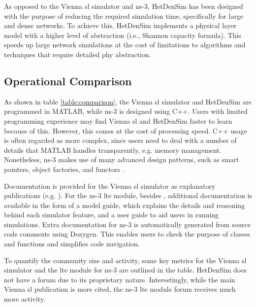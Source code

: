 \documentclass[conference]{IEEEtran}
\begin{document}
As opposed to the Vienna \ac{sl} simulator and ns-3, HetDenSim has been designed with the purpose of reducing the required simulation time, specifically for large and dense networks. To achieve this, HetDenSim implements a physical layer model with a higher level of abstraction (i.e., Shannon capacity formula). This speeds up large network simulations at the cost of limitations to algorithms and techniques that require detailed \ac{phy} abstraction.

\subsection{Operational Comparison}\label{subsect:operational}

As shown in table \ref{table:comparison}, the Vienna \ac{sl} simulator and HetDenSim are programmed in
MATLAB, while ns-3 is designed using C++.
 Users with limited programming experience may find Vienna \ac{sl} and HetDenSim faster to learn because of this. However, this comes at the cost of processing speed. C++ usage is often regarded as more complex, since users need to deal with a number of details that MATLAB handles transparently, e.g. memory management. Nonetheless, ns-3 makes use of many advanced design patterns, such as smart pointers, object factories, and functors \cite{Alexandrescu2001}.

Documentation is provided for the Vienna \ac{sl} simulator as explanatory publications (e.g. \cite{Ikuno2010}). For the ns-3 \ac{lte} module, besides \cite{Piro2011}, additional documentation is available in the form of a model guide, which explains the details and reasoning behind each simulator feature, and a user guide to aid users in running simulations. Extra documentation for ns-3 is automatically generated from source code comments using Doxygen. This enables users to check the purpose of classes and functions and simplifies code navigation.

To quantify the community size and activity, some key metrics for the  Vienna \ac{sl} simulator
\cite{Ikuno2010} and the \ac{lte} module for ns-3 \cite{Piro2011} are outlined in the table. HetDenSim does not have a forum due to its proprietary nature. Interestingly, while the main Vienna \ac{sl} publication is more cited, the ns-3 \ac{lte} module forum receives much more activity.
\end{document}
